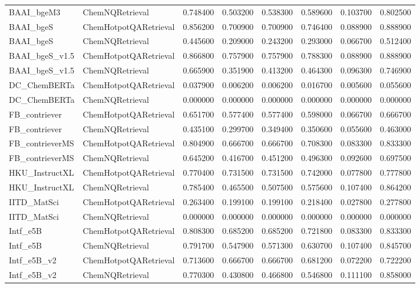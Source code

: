 {\begin{longtable}{llrrrrrr}
BAAI\_bgeM3 & ChemNQRetrieval & 0.748400 & 0.503200 & 0.538300 & 0.589600 & 0.103700 & 0.802500 \\
BAAI\_bgeS & ChemHotpotQARetrieval & 0.856200 & 0.700900 & 0.700900 & 0.746400 & 0.088900 & 0.888900 \\
BAAI\_bgeS & ChemNQRetrieval & 0.445600 & 0.209000 & 0.243200 & 0.293000 & 0.066700 & 0.512400 \\
BAAI\_bgeS\_v1.5 & ChemHotpotQARetrieval & 0.866800 & 0.757900 & 0.757900 & 0.788300 & 0.088900 & 0.888900 \\
BAAI\_bgeS\_v1.5 & ChemNQRetrieval & 0.665900 & 0.351900 & 0.413200 & 0.464300 & 0.096300 & 0.746900 \\
DC\_ChemBERTa & ChemHotpotQARetrieval & 0.037900 & 0.006200 & 0.006200 & 0.016700 & 0.005600 & 0.055600 \\
DC\_ChemBERTa & ChemNQRetrieval & 0.000000 & 0.000000 & 0.000000 & 0.000000 & 0.000000 & 0.000000 \\
FB\_contriever & ChemHotpotQARetrieval & 0.651700 & 0.577400 & 0.577400 & 0.598000 & 0.066700 & 0.666700 \\
FB\_contriever & ChemNQRetrieval & 0.435100 & 0.299700 & 0.349400 & 0.350600 & 0.055600 & 0.463000 \\
FB\_contrieverMS & ChemHotpotQARetrieval & 0.804900 & 0.666700 & 0.666700 & 0.708300 & 0.083300 & 0.833300 \\
FB\_contrieverMS & ChemNQRetrieval & 0.645200 & 0.416700 & 0.451200 & 0.496300 & 0.092600 & 0.697500 \\
HKU\_InstructXL & ChemHotpotQARetrieval & 0.770400 & 0.731500 & 0.731500 & 0.742000 & 0.077800 & 0.777800 \\
HKU\_InstructXL & ChemNQRetrieval & 0.785400 & 0.465500 & 0.507500 & 0.575600 & 0.107400 & 0.864200 \\
IITD\_MatSci & ChemHotpotQARetrieval & 0.263400 & 0.199100 & 0.199100 & 0.218400 & 0.027800 & 0.277800 \\
IITD\_MatSci & ChemNQRetrieval & 0.000000 & 0.000000 & 0.000000 & 0.000000 & 0.000000 & 0.000000 \\
Intf\_e5B & ChemHotpotQARetrieval & 0.808300 & 0.685200 & 0.685200 & 0.721800 & 0.083300 & 0.833300 \\
Intf\_e5B & ChemNQRetrieval & 0.791700 & 0.547900 & 0.571300 & 0.630700 & 0.107400 & 0.845700 \\
Intf\_e5B\_v2 & ChemHotpotQARetrieval & 0.713600 & 0.666700 & 0.666700 & 0.681200 & 0.072200 & 0.722200 \\
Intf\_e5B\_v2 & ChemNQRetrieval & 0.770300 & 0.430800 & 0.466800 & 0.546800 & 0.111100 & 0.858000 \\

\end{longtable}}
